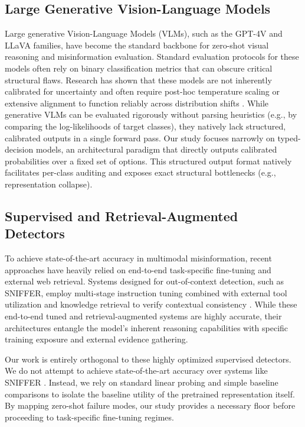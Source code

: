 \documentclass{article} %
\begin{document}
\subsection{Large Generative Vision-Language Models}
Large generative Vision-Language Models (VLMs), such as the GPT-4V and LLaVA families, have become the standard backbone for zero-shot visual reasoning and misinformation evaluation. Standard evaluation protocols for these models often rely on binary classification metrics that can obscure critical structural flaws. Research has shown that these models are not inherently calibrated for uncertainty and often require post-hoc temperature scaling or extensive alignment to function reliably across distribution shifts \citep{Tu2024EmpiricalInto}. While generative VLMs can be evaluated rigorously without parsing heuristics (e.g., by comparing the log-likelihoods of target classes), they natively lack structured, calibrated outputs in a single forward pass. Our study focuses narrowly on typed-decision models, an architectural paradigm that directly outputs calibrated probabilities over a fixed set of options. This structured output format natively facilitates per-class auditing and exposes exact structural bottlenecks (e.g., representation collapse).

\subsection{Supervised and Retrieval-Augmented Detectors}
To achieve state-of-the-art accuracy in multimodal misinformation, recent approaches have heavily relied on end-to-end task-specific fine-tuning and external web retrieval. Systems designed for out-of-context detection, such as SNIFFER, employ multi-stage instruction tuning combined with external tool utilization and knowledge retrieval to verify contextual consistency \citep{Qi2024SnifferMultimodal}. While these end-to-end tuned and retrieval-augmented systems are highly accurate, their architectures entangle the model's inherent reasoning capabilities with specific training exposure and external evidence gathering. 

Our work is entirely orthogonal to these highly optimized supervised detectors. We do not attempt to achieve state-of-the-art accuracy over systems like SNIFFER \citep{Qi2024SnifferMultimodal}. Instead, we rely on standard linear probing \citep{Pedregosa2011ScikitlearnMachine} and simple baseline comparisons to isolate the baseline utility of the pretrained representation itself. By mapping zero-shot failure modes, our study provides a necessary floor before proceeding to task-specific fine-tuning regimes.
\end{document}
